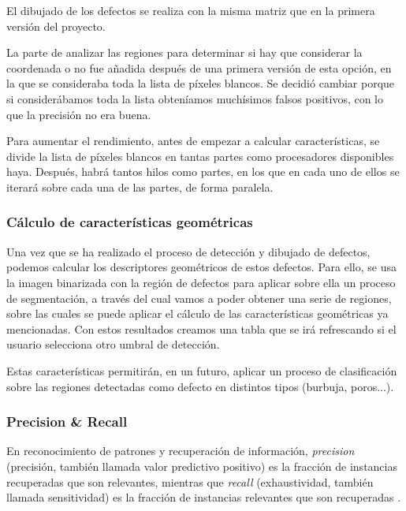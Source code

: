 
El dibujado de los defectos se realiza con la misma matriz que en la primera versión del proyecto.

La parte de analizar las regiones para determinar si hay que considerar la coordenada o no fue añadida después de una primera versión de esta opción, en la que se consideraba toda la lista de píxeles blancos. Se decidió cambiar porque si considerábamos toda la lista obteníamos muchísimos falsos positivos, con lo que la precisión no era buena.

Para aumentar el rendimiento, antes de empezar a calcular características, se divide la lista de píxeles blancos en tantas partes como procesadores disponibles haya. Después, habrá tantos hilos como partes, en los que en cada uno de ellos se iterará sobre cada una de las partes, de forma paralela.

\subsubsection{Cálculo de características geométricas}
Una vez que se ha realizado el proceso de detección y dibujado de defectos, podemos calcular los descriptores geométricos de estos defectos. Para ello, se usa la imagen binarizada con la región de defectos para aplicar sobre ella un proceso de segmentación, a través del cual vamos a poder obtener una serie de regiones, sobre las cuales se puede aplicar el cálculo de las características geométricas ya mencionadas. Con estos resultados creamos una tabla que se irá refrescando si el usuario selecciona otro umbral de detección.

Estas características permitirán, en un futuro, aplicar un proceso de clasificación sobre las regiones detectadas como defecto en distintos tipos (burbuja, poros...).

\subsubsection{Precision \& Recall}
En reconocimiento de patrones y recuperación de información, \textit{precision} (precisión, también llamada valor predictivo positivo) es la fracción de instancias recuperadas que son relevantes, mientras que \textit{recall} (exhaustividad, también llamada sensitividad) es la fracción de instancias relevantes que son recuperadas \cite{wiki:precisionandrecall}.

